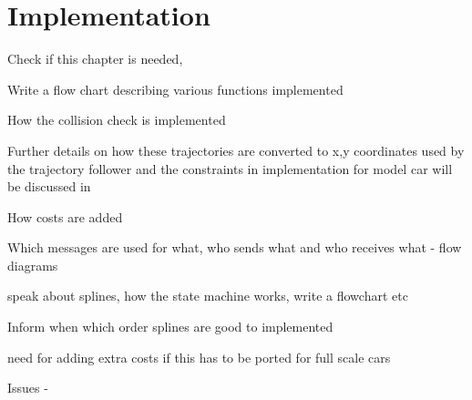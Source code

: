 \chapter{Implementation}
\label{implementation}
Check if this chapter is needed, 

Write a flow chart describing various functions implemented 

How the collision check is implemented

Further details on how these trajectories are converted to x,y coordinates used by the trajectory follower and the constraints in implementation for model car will be discussed in

How costs are added

Which messages are used for what, who sends what and who receives what - flow diagrams

speak about splines, how the state machine works, write a flowchart etc

Inform when which order splines are good to implemented

need for adding extra costs if this has to be ported for full scale cars

Issues - 